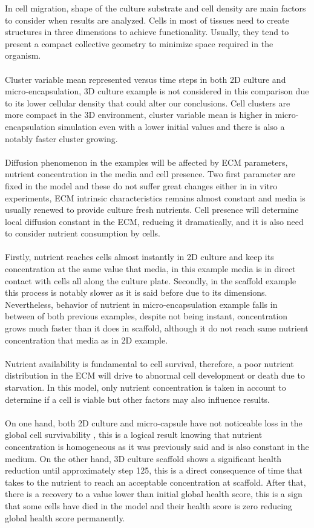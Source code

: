 In cell migration, shape of the culture substrate and cell density are main factors to consider when results are analyzed. Cells in most of tissues need to create structures in three dimensions to achieve functionality. Usually, they tend to present a compact collective geometry to minimize space required in the organism.\\
\\
Cluster variable mean represented versus time steps in both 2D culture and micro-encapsulation, 3D culture example is not considered in this comparison due to its lower cellular density that could alter our conclusions. Cell clusters are more compact in the 3D environment, cluster variable mean is higher in micro-encapsulation simulation even with a lower initial values and there is also a notably faster cluster growing.\\
\\
Diffusion phenomenon in the examples will be affected by ECM parameters, nutrient concentration in the media and cell presence. Two first parameter are fixed in the model and these do not suffer great changes either in in vitro experiments, ECM intrinsic characteristics remains almost constant and media is usually renewed to provide culture fresh nutrients. Cell presence will determine local diffusion constant in the ECM, reducing it dramatically, and it is also need to consider nutrient consumption by cells.\\
\\
Firstly, nutrient reaches cells almost instantly in 2D culture and keep its concentration at the same value that media, in this example media is in direct contact with cells all along the culture plate. Secondly, in the scaffold example this process is notably slower as it is said before due to its dimensions. Nevertheless, behavior of nutrient in micro-encapsulation example falls in between of both previous examples, despite not being instant, concentration grows much faster than it does in scaffold, although it do not reach same nutrient concentration that media as in 2D example.\\
\\
Nutrient availability is fundamental to cell survival, therefore, a poor nutrient distribution in the ECM will drive to abnormal cell development or death due to starvation. In this model, only nutrient concentration is taken in account to determine if a cell is viable but other factors may also influence results.\\
\\
On one hand, both 2D culture and micro-capsule have not noticeable loss in the global cell survivability , this is a logical result knowing that nutrient concentration is homogeneous as it was previously said and is also constant in the medium. On the other hand, 3D culture scaffold shows a significant health reduction until approximately step 125, this is a direct consequence of time that takes to the nutrient to reach an acceptable concentration at scaffold. After that, there is a recovery to a value lower than initial global health score, this is a sign that some cells have died in the model and their health score is zero reducing global health score permanently.\\
